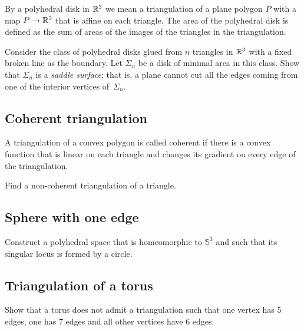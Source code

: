 By a polyhedral disk in $\mathbb{R}^3$
we mean a triangulation of a plane polygon $P$ with a map $P\to\mathbb{R}^3$ that is affine on each triangle.
The area of the polyhedral disk is defined as the sum of areas of the images of the triangles in the triangulation.

\begin{pr}
Consider the  class of polyhedral disks glued from $n$ triangles in $\mathbb{R}^3$ 
with a fixed broken line as the boundary.
Let $\Sigma_n$ be a disk of minimal area in this class.
Show that $\Sigma_n$ is a \emph{saddle surface};
that is, a plane cannot cut all the edges coming from one of the interior vertices of~$\Sigma_n$.
\end{pr}

\subsection*{Coherent triangulation\easy}\label{Coherent triangulation} 

A triangulation of a convex polygon is called coherent if there is a convex function that is linear on each triangle and changes its gradient on every edge of the triangulation.

\begin{pr}
Find a non-coherent triangulation of a triangle.
\end{pr}



\subsection*{Sphere with one edge\hard}\label{panov-S^3} 

\begin{pr}
Construct a polyhedral space that is homeomorphic to $\mathbb{S}^3$ and such that its singular locus is formed by a circle.
\end{pr}


\subsection*{Triangulation of a torus}\label{Triangulation of a torus}

\begin{pr}
Show that a torus does not admit a triangulation 
such that one vertex has 5 edges,
one has 7 edges and 
all other vertices have 
6 edges. 
\end{pr}


